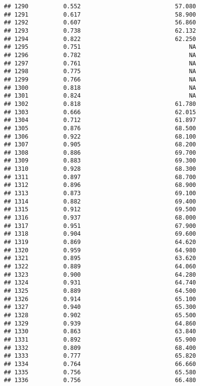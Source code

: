 \documentclass[
]{article}
\begin{document}
\begin{verbatim}
## 1290          0.552                           57.080
## 1291          0.617                           58.900
## 1292          0.607                           56.860
## 1293          0.738                           62.132
## 1294          0.822                           62.250
## 1295          0.751                               NA
## 1296          0.782                               NA
## 1297          0.761                               NA
## 1298          0.775                               NA
## 1299          0.766                               NA
## 1300          0.818                               NA
## 1301          0.824                               NA
## 1302          0.818                           61.780
## 1303          0.666                           62.015
## 1304          0.712                           61.897
## 1305          0.876                           68.500
## 1306          0.922                           68.100
## 1307          0.905                           68.200
## 1308          0.886                           69.700
## 1309          0.883                           69.300
## 1310          0.928                           68.300
## 1311          0.897                           68.700
## 1312          0.896                           68.900
## 1313          0.873                           69.100
## 1314          0.882                           69.400
## 1315          0.912                           69.500
## 1316          0.937                           68.000
## 1317          0.951                           67.900
## 1318          0.904                           69.600
## 1319          0.869                           64.620
## 1320          0.959                           64.980
## 1321          0.895                           63.620
## 1322          0.889                           64.060
## 1323          0.900                           64.280
## 1324          0.931                           64.740
## 1325          0.889                           64.500
## 1326          0.914                           65.100
## 1327          0.940                           65.300
## 1328          0.902                           65.500
## 1329          0.939                           64.860
## 1330          0.863                           63.840
## 1331          0.892                           65.900
## 1332          0.809                           68.400
## 1333          0.777                           65.820
## 1334          0.764                           66.660
## 1335          0.756                           65.580
## 1336          0.756                           66.480

\end{verbatim}
\end{document}
